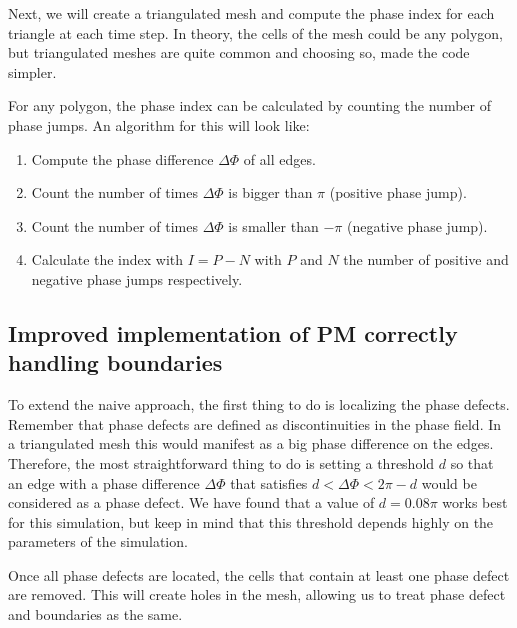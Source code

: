 \documentclass[twocolumn]{article}
\begin{document}
Next, we will create a triangulated mesh and compute the phase index for
each triangle at each time step. In theory, the cells of the mesh could
be any polygon, but triangulated meshes are quite common and choosing
so, made the code simpler.

For any polygon, the phase index can be calculated by counting the
number of phase jumps. An algorithm for this will look like:

\begin{enumerate}
    \def\labelenumi{\arabic{enumi}.}
    \tightlist
  \item
    Compute the phase difference \(\Delta\Phi\) of all edges.
  \item
    Count the number of times \(\Delta\Phi\) is bigger than \(\pi\)
    (positive phase jump).
  \item
    Count the number of times \(\Delta\Phi\) is smaller than \(-\pi\)
    (negative phase jump).
  \item
    Calculate the index with \(I = P - N\) with \(P\) and \(N\) the number
    of positive and negative phase jumps respectively.
\end{enumerate}

\subsection{Improved implementation of PM correctly handling boundaries}

To extend the naive approach, the first thing to do is localizing the
phase defects. Remember that phase defects are defined as
discontinuities in the phase field. In a triangulated mesh this would
manifest as a big phase difference on the edges. Therefore, the most
straightforward thing to do is setting a threshold \(d\) so that an edge
with a phase difference \(\Delta\Phi\) that satisfies
\(d<\Delta\Phi<2\pi-d\) would be considered as a phase defect. We have
found that a value of \(d=0.08\pi\) works best for this simulation, but
keep in mind that this threshold depends highly on the parameters of the
simulation.

Once all phase defects are located, the cells that contain at least one
phase defect are removed. This will create holes in the mesh, allowing
us to treat phase defect and boundaries as the same.
\end{document}
